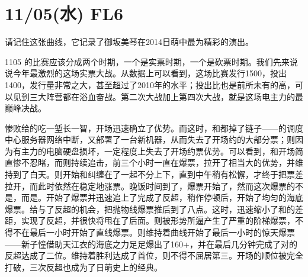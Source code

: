 \section{11/05(水) FL6}



请记住这张曲线，它记录了御坂美琴在2014日萌中最为精彩的演出。

1105 的比赛应该分成两个时期，一个是实票时期，一个是砍票时期。我们先来说说今年最激烈的这场实票大战。从数据上可以看到，这场比赛发行1500，投出1400，发行量非常之大，甚至超过了2010年的水平；投出比也是前所未有的高，可以见到三大阵营都在浴血奋战。第二次大战加上第四次大战，就是这场电主力的最巅峰决战。

惨败给的吃一堑长一智，开场迅速确立了优势。而这时，和都掉了链子——的调度中心服务器网络中断，又部署了一台新机器，从而失去了开场约的大部分票；则因为有主力的电脑硬盘损坏，一定程度上失去了开场约票优势。可以看到，和开场简直惨不忍睹，而则持续追击，前三个小时一直在爆票，拉开了相当大的优势，并维持到了白天。则开始和纠缠在了一起不分上下，直到中午稍有松懈，才终于把票差拉开，而此时依然在稳定地涨票。晚饭时间到了，爆票开始了，然而这次爆票的不是，而是。开始了爆票并迅速追上了完成了反超，稍作停顿后，开始了均匀的海底爆票。给与了反超的机会，把抛物线爆票推后到了八点。这时，迅速缩小了和的差距，实现了反超，并很快将甩在了后面。则被形势所逼产生了严重的阶梯爆票，不得不在最后一小时开始了直线爆票。则维持着曲线开始了最后一小时的惊天爆票——新子憧借助天江衣的海底之力足足爆出了160+，并在最后几分钟完成了对的反超达成了二位。维持着胜利达成了首位，则不得不屈居第三。开场的顺位被完全打破，三次反超也成为了日萌史上的经典。

